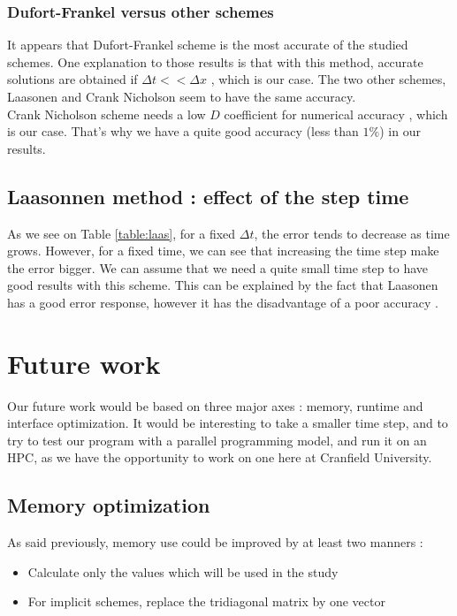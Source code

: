 \documentclass{article}
\begin{document}
            \subsubsection{Dufort-Frankel versus other schemes}
                It appears that Dufort-Frankel scheme is the most accurate of the studied schemes. One explanation to those
                results is that with this method, accurate solutions are obtained if $\Delta t << \Delta x$ \cite{df}, which
                is our case.
                The two other schemes, Laasonen and Crank Nicholson seem to have the same accuracy.
                \\
                Crank Nicholson scheme needs a low $D$ coefficient for numerical accuracy \cite{crank}, which is our case. That's why 
                we have a quite good accuracy (less than $1\%$) in our results.
            
        \subsection{Laasonnen method : effect of the step time}
            As we see on Table \ref{table:laas}, for a fixed $\Delta t$, the error tends to decrease as time grows. However,
            for a fixed time, we can see that increasing the time step make the error bigger. We can assume that we need a
            quite small time step to have good results with this scheme. This can be explained by the fact that
            Laasonen has a good error response, however it has the disadvantage of a poor accuracy \cite{laas}.
    \newpage
    \section{Future work}
        Our future work would be based on three major axes : memory, runtime and interface optimization.
        It would be interesting to take a smaller time step, and to try to test our program
        with a parallel programming model, and run it on an HPC, as we have the opportunity 
        to work on one here at Cranfield University.
        \subsection{Memory optimization}
            As said previously, memory use could be improved by at least two manners :
            \begin{itemize}
                \item{Calculate only the values which will be used in the study}
                \item{For implicit schemes, replace the tridiagonal matrix by one vector}
            \end{itemize}
\end{document}
